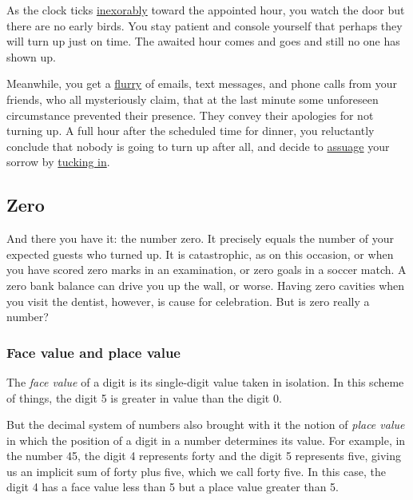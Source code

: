 \documentclass[
  a4paper,
]{article}
\begin{document}
As the clock ticks
\href{https://www.thefreedictionary.com/inexorably}{inexorably} toward
the appointed hour, you watch the door but there are no early birds. You
stay patient and console yourself that perhaps they will turn up just on
time. The awaited hour comes and goes and still no one has shown up.

Meanwhile, you get a
\href{https://dictionary.cambridge.org/dictionary/english/flurry}{flurry}
of emails, text messages, and phone calls from your friends, who all
mysteriously claim, that at the last minute some unforeseen circumstance
prevented their presence. They convey their apologies for not turning
up. A full hour after the scheduled time for dinner, you reluctantly
conclude that nobody is going to turn up after all, and decide to
\href{https://www.merriam-webster.com/dictionary/assuage}{assuage} your
sorrow by
\href{https://www.oxfordlearnersdictionaries.com/definition/english/tuck-in}{tucking
in}.

\hypertarget{zero}{%
\subsection{Zero}\label{zero}}

And there you have it: the number zero. It precisely equals the number
of your expected guests who turned up. It is catastrophic, as on this
occasion, or when you have scored zero marks in an examination, or zero
goals in a soccer match. A zero bank balance can drive you up the wall,
or worse. Having zero cavities when you visit the dentist, however, is
cause for celebration. But is zero really a number?

\hypertarget{face-value-and-place-value}{%
\subsubsection{Face value and place
value}\label{face-value-and-place-value}}

The \emph{face value} of a digit is its single-digit value taken in
isolation. In this scheme of things, the digit 5 is greater in value
than the digit 0.

But the decimal system of numbers also brought with it the notion of
\emph{place value} in which the position of a digit in a number
determines its value. For example, in the number 45, the digit 4
represents forty and the digit 5 represents five, giving us an implicit
sum of forty plus five, which we call forty five. In this case, the
digit 4 has a face value less than 5 but a place value greater than 5.
\end{document}
